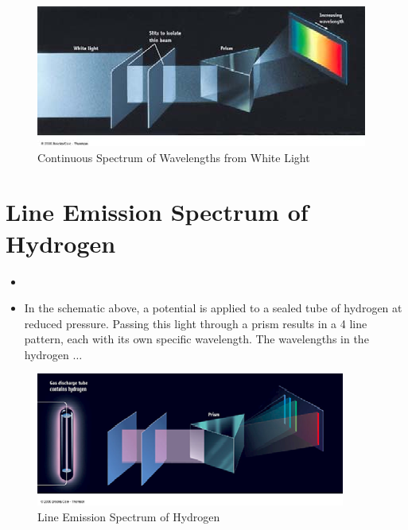 \documentclass[
	chapter=7,
	title={Quantum Theory {\&} the Electronic Structure of Atoms},
	showanswers=true,
]{chem122notes}
\begin{document}
\begin{figure}[H]
	\centering
	\includegraphics[width=\textwidth]{chapter7/continuous-spectrum}
	\caption{Continuous Spectrum of Wavelengths from White Light}
	\label{fig:continuous-spectrum}
\end{figure}

\section{Line Emission Spectrum of Hydrogen}\label{sec:line-emission-spectrum-of-hydrogen}
\begin{itemize}
	\item {}
	\item In the schematic above, a potential is applied to a sealed tube of hydrogen at reduced pressure.
	Passing this light through a prism results in a 4 line pattern, each with its own specific wavelength.
	The wavelengths in the hydrogen $\dots$
\end{itemize}

\begin{figure}[H]
	\centering
	\includegraphics[width=\textwidth]{chapter7/line_emission}
	\caption{Line Emission Spectrum of Hydrogen}
	\label{fig:line-emission}
\end{figure}
\end{document}
